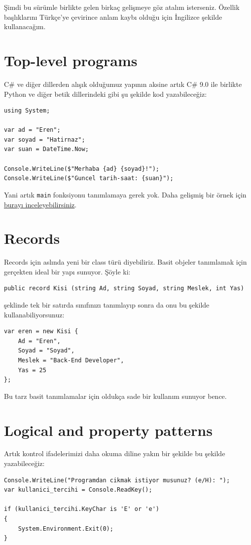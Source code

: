 \documentclass[11pt]{article}
\begin{document}
Şimdi bu sürümle birlikte gelen birkaç gelişmeye göz atalım isterseniz. Özellik
başlıklarını Türkçe'ye çevirince anlam kaybı olduğu için İngilizce şekilde
kullanacağım.

\section{Top-level programs}
\label{sec:org3f58a6f}
C\# ve diğer dillerden alışık olduğumuz yapının aksine artık C\# 9.0 ile
birlikte Python ve diğer betik dillerindeki gibi şu şekilde kod
yazabileceğiz:
\begin{verbatim}
using System;

var ad = "Eren";
var soyad = "Hatirnaz";
var suan = DateTime.Now;

Console.WriteLine($"Merhaba {ad} {soyad}!");
Console.WriteLine($"Guncel tarih-saat: {suan}");
\end{verbatim}
Yani artık \texttt{main} fonksiyonu tanımlamaya gerek yok. Daha gelişmiş bir örnek
için \href{https://github.com/dotnet/iot/tree/master/samples/led-blink}{burayı inceleyebilirsiniz}.
\section{Records}
\label{sec:org244e496}
Records için aslında yeni bir class türü diyebiliriz. Basit objeler
tanımlamak için gerçekten ideal bir yapı sunuyor. Şöyle ki:
\begin{verbatim}
public record Kisi (string Ad, string Soyad, string Meslek, int Yas)
\end{verbatim}
şeklinde tek bir satırda sınıfınızı tanımlayıp sonra da onu bu şekilde
kullanabiliyorsunuz:
\begin{verbatim}
var eren = new Kisi {
    Ad = "Eren",
    Soyad = "Soyad",
    Meslek = "Back-End Developer",
    Yas = 25
};
\end{verbatim}
Bu tarz basit tanımlamalar için oldukça sade bir kullanım sunuyor bence.
\section{Logical and property patterns}
\label{sec:org4bd9c4e}
Artık kontrol ifadelerimizi daha okuma diline yakın bir şekilde bu şekilde
yazabileceğiz:
\begin{verbatim}
Console.WriteLine("Programdan cikmak istiyor musunuz? (e/H): ");
var kullanici_tercihi = Console.ReadKey();

if (kullanici_tercihi.KeyChar is 'E' or 'e')
{
    System.Environment.Exit(0);
}
\end{verbatim}
\end{document}
